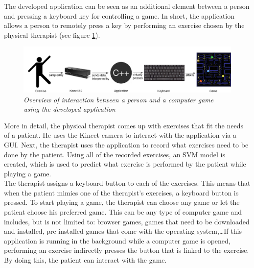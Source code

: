The developed application can be seen as an additional element between a person and pressing a keyboard key for controlling a game. In short, the application allows a person to remotely press a key by performing an exercise chosen by the physical therapist (see figure \ref{fig: overview_application_interaction}).\\

\begin{figure}[H]
\begin{center}
\includegraphics[width=14cm]{Concept2.png}
\caption{\emph{Overview of interaction between a person and a computer game using the developed application}}
\label{fig: overview_application_interaction}
\end{center}
\end{figure}

More in detail, the physical therapist comes up with exercises that fit the needs of a patient. He uses the Kinect camera to interact with the application via a GUI. Next, the therapist uses the application to record what exercises need to be done by the patient. Using all of the recorded exercises, an SVM model is created, which is used to predict what exercise is performed by the patient while playing a game.\\

The therapist assigns a keyboard button to each of the exercises. This means that when the patient mimics one of the therapist's exercises, a keyboard button is pressed. To start playing a game, the therapist can choose any game or let the patient choose his preferred game. This can be any type of computer game and includes, but is not limited to: browser games, games that need to be downloaded and installed, pre-installed games that come with the operating system,\ldots If this application is running in the background while a computer game is opened, performing an exercise indirectly presses the button that is linked to the exercise. By doing this, the patient can interact with the game.\\

